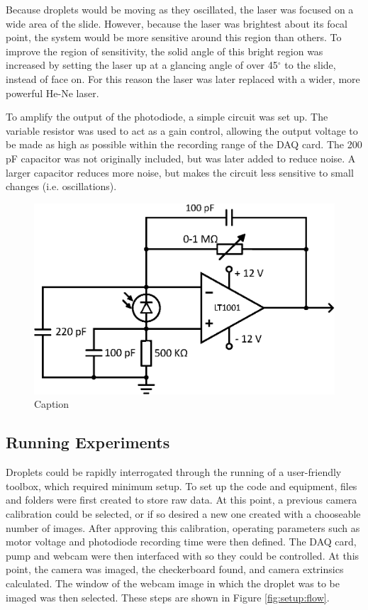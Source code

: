 \documentclass{physics_article_B}
\begin{document}
        Because droplets would be moving as they oscillated, the laser was focused on a wide area of the slide. However, because the laser was brightest about its focal point, the system would be more sensitive around this region than others. To improve the region of sensitivity, the solid angle of this bright region was increased by setting the laser up at a glancing angle of over 45$^{\circ}$ to the slide, instead of face on. For this reason the laser was later replaced with a wider, more powerful He-Ne laser.
        
        To amplify the output of the photodiode, a simple circuit was set up\cite{artofelectronics}. The variable resistor was used to act as a gain control, allowing the output voltage to be made as high as possible within the recording range of the DAQ card. The 200 pF capacitor was not originally included, but was later added to reduce noise. A larger capacitor reduces more noise, but makes the circuit less sensitive to small changes (i.e. oscillations).
    
        \begin{figure}[H]
            \centering
            \includegraphics[scale=0.8]{Figures/PDCircuit.eps}
            \caption{Caption}
            \label{fig:my_label}
        \end{figure}
    

    \subsection{Running Experiments\label{sect:method:exp}}
        
        Droplets could be rapidly interrogated through the running of a user-friendly toolbox, which required minimum setup. To set up the code and equipment, files and folders were first created to store raw data. At this point, a previous camera calibration could be selected, or if so desired a new one created with a chooseable number of images. After approving this calibration, operating parameters such as motor voltage and photodiode recording time were then defined. The DAQ card, pump and webcam were then interfaced with so they could be controlled. At this point, the camera was imaged, the checkerboard found, and camera extrinsics calculated. The window of the webcam image in which the droplet was to be imaged was then selected. These steps are shown in Figure \ref{fig:setup:flow}.
        
\end{document}
